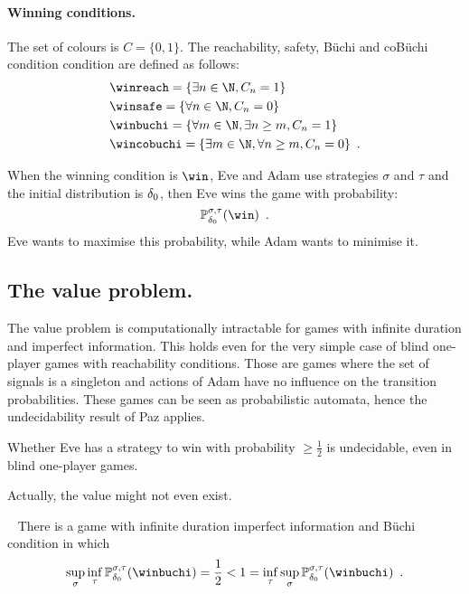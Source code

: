\paragraph{Winning conditions.}

The set of colours is $C=\{0,1\}$.
The reachability, safety, B{\"u}chi and coB{\"u}chi condition
 condition are defined as follows:
 \begin{align*}
 &\winreach=\{\exists n\in\N, C_n  = 1\}\\
&\winsafe=\{\forall n\in\N, C_n = 0\}\\
&\winbuchi=\{\forall m \in \N, \exists n \geq m, C_n=1\}\\
&\wincobuchi = \{\exists m \in \N, \forall n \geq m, C_n = 0\}\enspace.
\end{align*}

When the winning condition is $\win$,
Eve and Adam use strategies
$\sigma$ and $\tau$ and the initial distribution is $\delta_0$,
then Eve wins the game with probability:
\[
\mathbb{P}^{\sigma,\tau}_{\ini}(\win)\enspace.
\]
Eve wants to maximise this probability, while Adam wants
to minimise it.  



\subsection{The value problem.}

The value problem is computationally intractable
for games with infinite duration and imperfect information.
This holds even for the very simple case
of blind one-player games with reachability conditions.
Those are games where the set of
signals is a singleton and actions of Adam have no influence
on the transition probabilities. These games can be seen
as probabilistic automata, hence the undecidability result of Paz applies.

\begin{theorem}\cite{Paz}
Whether Eve has a strategy to win with probability $\geq \frac{1}{2}$
is undecidable, even in blind one-player games.
\end{theorem}

Actually, the value might not even exist.
\begin{proposition}~\cite{repgames}
There is a game with infinite duration imperfect information and B{\"u}chi condition
in which 
\[
\sup_\sigma \inf_\tau \mathbb{P}^{\sigma,\tau}_{\ini}(\winbuchi)
=
\frac{1}{2}
<
1
=
\inf_\tau \sup_\sigma  \mathbb{P}^{\sigma,\tau}_{\ini}(\winbuchi)\enspace.
\]
\end{proposition}

